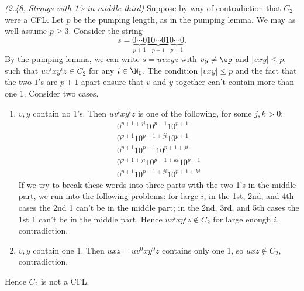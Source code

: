 \begin{problem}{\it (2.48, Strings with 1's in middle third)}
Suppose by way of contradiction that $C_2$ were a CFL. Let $p$ be the pumping length, as in the pumping lemma. We may as well assume $p\ge 3$. Consider the string
\[
s=\underbrace{0\cdots 0}_{p+1}\underbrace{10\cdots 01}_{p+1}\underbrace{0\cdots 0}_{p+1}.
\]
By the pumping lemma, we can write $s=uvxyz$ with $vy\ne \ep$ and $|vxy|\le p$, such that $uv^ixy^iz\in C_2$ for any $i\in \N_0$. The condition $|vxy|\le p$ and the fact that the two $1$'s are $p+1$ apart ensure that $v$ and $y$ together can't contain more than one 1. Consider two cases.%
\begin{enumerate}
\item
$v,y$ contain no 1's. Then $uv^ixy^iz$ is one of the following, for some $j, k>0$:
\begin{gather*}
0^{p+1+ji}10^{p-1}10^{p+1}\\
0^{p+1}10^{p-1+ji}10^{p+1}\\
0^{p+1}10^{p-1}10^{p+1+ji}\\
0^{p+1+ji}10^{p-1+ki}10^{p+1}\\
0^{p+1}10^{p-1+ji}10^{p+1+ki}
\end{gather*}
If we try to break these words into three parts with the two 1's in the middle part, we run into the following problems: for large $i$, in the 1st, 2nd, and 4th cases the 2nd 1 can't be in the middle part; in the 2nd, 3rd, and 5th cases the 1st 1 can't be in the middle part. Hence $uv^ixy^iz\nin C_2$ for large enough $i$, contradiction.
\item
$v,y$ contain one 1. Then $uxz=uv^0xy^0z$ contains only one 1, so $uxz\nin C_2$, contradiction.
\end{enumerate}
Hence $C_2$ is not a CFL.
\end{problem}

\pagebreak

